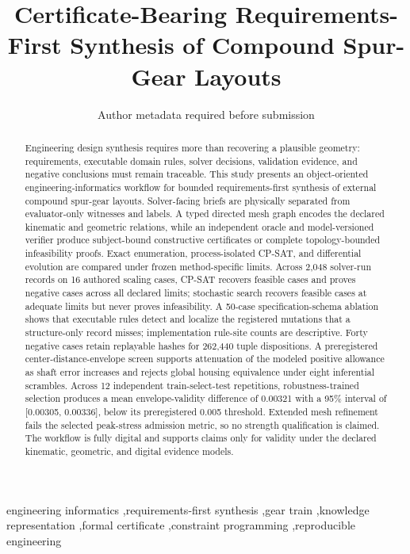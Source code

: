 \documentclass[preprint,12pt]{elsarticle}
\begin{document}
\begin{frontmatter}
\title{Certificate-Bearing Requirements-First Synthesis of Compound Spur-Gear Layouts}
\author{Author metadata required before submission}
\begin{abstract}
Engineering design synthesis requires more than recovering a plausible geometry: requirements, executable domain rules, solver decisions, validation evidence, and negative conclusions must remain traceable. This study presents an object-oriented engineering-informatics workflow for bounded requirements-first synthesis of external compound spur-gear layouts. Solver-facing briefs are physically separated from evaluator-only witnesses and labels. A typed directed mesh graph encodes the declared kinematic and geometric relations, while an independent oracle and model-versioned verifier produce subject-bound constructive certificates or complete topology-bounded infeasibility proofs. Exact enumeration, process-isolated CP-SAT, and differential evolution are compared under frozen method-specific limits. Across 2,048 solver-run records on 16 authored scaling cases, CP-SAT recovers feasible cases and proves negative cases across all declared limits; stochastic search recovers feasible cases at adequate limits but never proves infeasibility. A 50-case specification-schema ablation shows that executable rules detect and localize the registered mutations that a structure-only record misses; implementation rule-site counts are descriptive. Forty negative cases retain replayable hashes for 262,440 tuple dispositions. A preregistered center-distance-envelope screen supports attenuation of the modeled positive allowance as shaft error increases and rejects global housing equivalence under eight inferential scrambles. Across 12 independent train-select-test repetitions, robustness-trained selection produces a mean envelope-validity difference of 0.00321 with a 95\% interval of [0.00305, 0.00336], below its preregistered 0.005 threshold. Extended mesh refinement fails the selected peak-stress admission metric, so no strength qualification is claimed. The workflow is fully digital and supports claims only for validity under the declared kinematic, geometric, and digital evidence models.
\end{abstract}
\begin{keyword}
engineering informatics \sep requirements-first synthesis \sep gear train \sep knowledge representation \sep formal certificate \sep constraint programming \sep reproducible engineering
\end{keyword}
\end{frontmatter}
\end{document}
